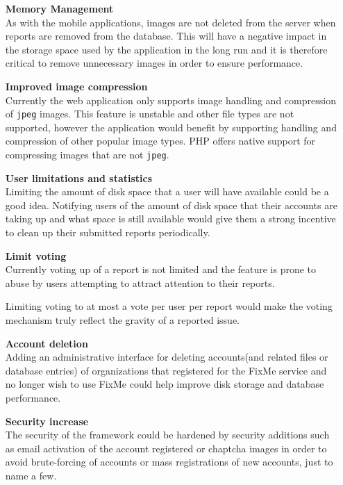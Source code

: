 \documentclass[12pt]{ecsproject}     %
\begin{document}
\begin{itemize}
\item[\textbf{Memory Management}]\hfill \\
As with the mobile applications, images are not deleted from the server when reports are removed from the database. This will have a negative impact in the storage space used by the application in the long run and it is therefore critical to remove unnecessary images in order to ensure performance.
\item[\textbf{Improved image compression}]\hfill\\
Currently the web application only supports image handling and compression of \texttt{jpeg} images. This feature is unstable and other file types are not supported, however the application would benefit by supporting handling and compression of other popular image types. PHP offers native support for compressing images that are not \texttt{jpeg}.
\item[\textbf{User limitations and statistics}]\hfill\\
Limiting the amount of disk space that a user will have available could be a good idea. Notifying users of the amount of disk space that their accounts are taking up and what space is still available would give them a strong incentive to clean up their submitted reports periodically.
\item[\textbf{Limit voting}]\hfill\\
Currently voting up of a report is not limited and the feature is prone to abuse by users attempting to attract attention to their reports.

Limiting voting to at most a vote per user per report would make the voting mechanism truly reflect the gravity of a reported issue.
\item[\textbf{Account deletion}]\hfill \\
Adding an administrative interface for deleting accounts(and related files or database entries) of organizations that registered for the FixMe service and no longer wish to use FixMe could help improve disk storage and database performance.
\item[\textbf{Security increase}]\hfill \\
The security of the framework could be hardened by security additions such as email activation of the account registered or chaptcha images in order to avoid brute-forcing of accounts or mass registrations of new accounts, just to name a few.
\end{itemize}
\end{document}
